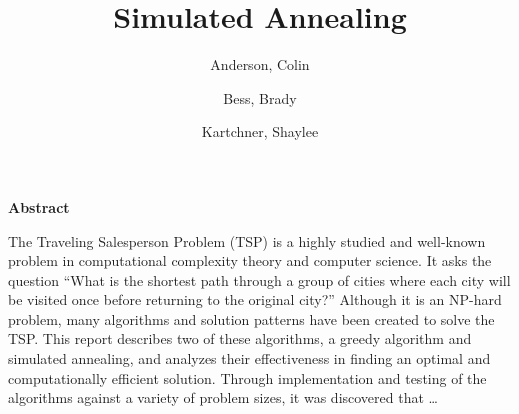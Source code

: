 \documentclass{article}
\title{Simulated Annealing}
\author{
    Anderson, Colin
    \and
    Bess, Brady
    \and
    Kartchner, Shaylee}
\date{}
\begin{document}
\maketitle

\noindent\makebox[\linewidth]{\rule{\textwidth}{0.4pt}}

\begin{center}
    \textbf{Abstract}
\end{center}

The Traveling Salesperson Problem (TSP) is a highly studied and well-known problem in computational complexity theory and computer science.  It asks the question ``What is the shortest path through a group of cities where each city will be visited once before returning to the original city?'' Although it is an NP-hard problem, many algorithms and solution patterns have been created to solve the TSP.  This report describes two of these algorithms, a greedy algorithm and simulated annealing, and analyzes their effectiveness in finding an optimal and computationally efficient solution.  Through implementation and testing of the algorithms against a variety of problem sizes, it was discovered that \dots

\noindent\makebox[\linewidth]{\rule{\textwidth}{0.4pt}}
\end{document}
